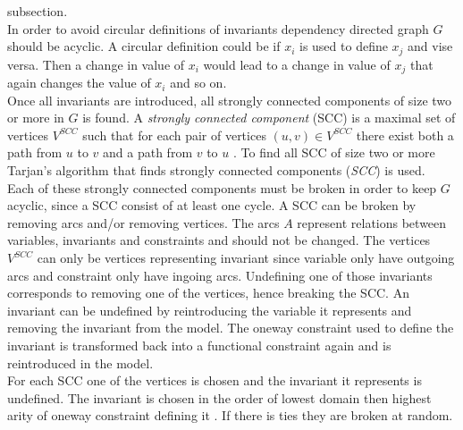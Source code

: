 subsection. \medskip \\
In order to avoid circular definitions of invariants dependency directed graph $G$ should be acyclic. A circular 
definition could be if $x_i$ is used to define $x_j$ and vise versa. Then a change in value 
of $x_i$ would lead to a change in value of $x_j$ that again changes the value of $x_i$ and so on. \\ 
Once all invariants are introduced, all strongly connected components of size two or more in $G$ is found. A 
\emph{strongly connected component} (SCC) is a maximal set of vertices $V^{SCC}$ such that for each pair of vertices 
$(u,v) \in V^{SCC}$ there exist both a path from $u$ to $v$ and a path from $v$ to $u$ \cite[p. 1170]{cormen}. 
To find all SCC of size two or more Tarjan's algorithm  that finds strongly 
connected components (\emph{SCC}) is used.  \\ 
Each of these strongly connected components must be broken in order to keep $G$ acyclic, since a SCC consist of at 
least one cycle. A SCC can be broken by removing arcs and/or removing vertices. The arcs $A$ represent relations 
between variables, invariants and constraints and should not be changed. The vertices $V^{SCC}$ can only be vertices 
representing invariant since variable only have outgoing arcs and constraint only have ingoing arcs. Undefining one of 
those invariants corresponds to removing one of the vertices, hence breaking the SCC. An invariant can be undefined by 
reintroducing the variable it represents and removing the invariant from the model. The oneway constraint used to 
define the invariant is transformed back into a functional constraint again and is reintroduced in the model. \\
For each SCC one of the vertices is chosen and the invariant it represents is undefined. The invariant is chosen in the 
order of lowest domain then highest arity of oneway constraint defining it . If there is ties 
they are broken at random.  \\  
